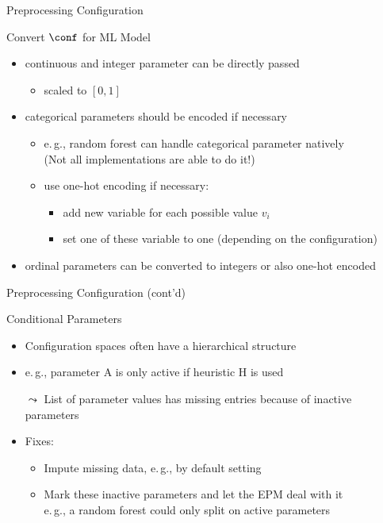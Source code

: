 \begin{frame}[c]{Preprocessing Configuration}

\begin{block}{Convert $\conf$ for ML Model}
  \begin{itemize}
    \item continuous and integer parameter can be directly passed
    \begin{itemize}
      \item scaled to $[0,1]$
    \end{itemize}
    \pause
    \item categorical parameters should be encoded if necessary
    \begin{itemize}
      \item e.$\,$g., random forest can handle categorical parameter natively\\
      (Not all implementations are able to do it!) 
      \item use one-hot encoding if necessary:
      \begin{itemize}
        \item add new variable for each possible value $v_i$
        \item set one of these variable to one (depending on the configuration)
      \end{itemize}
    \end{itemize}
    \pause
    \item ordinal parameters can be converted to integers or also one-hot encoded
  \end{itemize}
\end{block}


\end{frame}
\begin{frame}[c]{Preprocessing Configuration (cont'd)}

\begin{block}{Conditional Parameters}
  \begin{itemize}
    \item Configuration spaces often have a hierarchical structure
    \item e.$\,$g., parameter A is only active if heuristic H is used
    \pause
    \item[$\leadsto$] List of parameter values has missing entries because of inactive parameters
    \medskip
    \pause
    \item Fixes:
    \begin{itemize}
    	\item Impute missing data, e.$\,$g., by default setting
    	\item Mark these inactive parameters and let the EPM deal with it\\
    		  e.$\,$g., a random forest could only split on active parameters
    \end{itemize}
  \end{itemize}
\end{block}

\end{frame}
